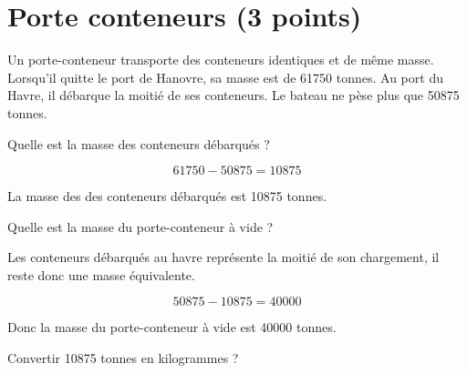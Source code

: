 \section{Porte conteneurs (3 points)}

Un porte-conteneur transporte des conteneurs identiques et de même masse.
Lorsqu'il quitte le port de Hanovre, sa masse est de \num{61750} tonnes.
Au port du Havre, il débarque la moitié de ses conteneurs. Le bateau ne pèse plus que \num{50875} tonnes.

\begin{questions}
	\question[1] Quelle est la masse des conteneurs débarqués ?
	\begin{solution}
		\begin{equation*}
			\num{61750} - \num{50875} = \num{10875}
		\end{equation*}
		
		La masse des des conteneurs débarqués est \num{10875} tonnes.
	\end{solution}

	\question[1] Quelle est la masse du porte-conteneur à vide ?
	
	\begin{solution}
		Les conteneurs débarqués au havre représente la moitié de son chargement, il reste donc une masse équivalente.
		
		\begin{equation*}
			\num{50875} - \num{10875} = \num{40000}
		\end{equation*}
		
		Donc la masse du porte-conteneur à vide est \num{40000} tonnes.
	\end{solution}

	\question[1] Convertir  \num{10875} tonnes en kilogrammes ?
\end{questions}